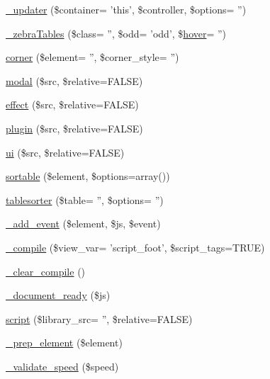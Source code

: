 \begin{DoxyCompactItemize}
\item 
\hyperlink{class_c_i___jquery_a406a331f77c28df7ef87bc4ab0c9340b}{\-\_\-updater} (\$container= 'this', \$controller, \$options= '')
\item 
\hyperlink{class_c_i___jquery_a15c7aa190a2393ebd888da2a6a612f6c}{\-\_\-zebra\-Tables} (\$class= '', \$odd= 'odd', \$\hyperlink{class_c_i___javascript_ab699260782310abba39faf37c2866c48}{hover}= '')
\item 
\hyperlink{class_c_i___jquery_a0194acb433b4ce6b5b0d9d30cccceafb}{corner} (\$element= '', \$corner\-\_\-style= '')
\item 
\hyperlink{class_c_i___jquery_a951696f5f5092fee0d2aba1f8602b419}{modal} (\$src, \$relative=F\-A\-L\-S\-E)
\item 
\hyperlink{class_c_i___jquery_a42898d255de9b25100e042825a1c4633}{effect} (\$src, \$relative=F\-A\-L\-S\-E)
\item 
\hyperlink{class_c_i___jquery_a25a0d7f0c18dac193aa2c67908c85c89}{plugin} (\$src, \$relative=F\-A\-L\-S\-E)
\item 
\hyperlink{class_c_i___jquery_ad2d6d964ed10597e0223f883c553cf0c}{ui} (\$src, \$relative=F\-A\-L\-S\-E)
\item 
\hyperlink{class_c_i___jquery_afb2aa7347e6ff89ab0177478a7f3869d}{sortable} (\$element, \$options=array())
\item 
\hyperlink{class_c_i___jquery_adb63aaf8e4cfc75853599e65ac3574a4}{tablesorter} (\$table= '', \$options= '')
\item 
\hyperlink{class_c_i___jquery_acb1530e106b7717d7c031dcb082a0da8}{\-\_\-add\-\_\-event} (\$element, \$js, \$event)
\item 
\hyperlink{class_c_i___jquery_acff3bdbec9dca4a5ad6d16eed6f15607}{\-\_\-compile} (\$view\-\_\-var= 'script\-\_\-foot', \$script\-\_\-tags=T\-R\-U\-E)
\item 
\hyperlink{class_c_i___jquery_a8508147ee3b37f58e7c58f365c6c1409}{\-\_\-clear\-\_\-compile} ()
\item 
\hyperlink{class_c_i___jquery_a5d111acaf02096fa67c90954167c202f}{\-\_\-document\-\_\-ready} (\$js)
\item 
\hyperlink{class_c_i___jquery_a9ea7c49c96462a9ee8f8242c257937ac}{script} (\$library\-\_\-src= '', \$relative=F\-A\-L\-S\-E)
\item 
\hyperlink{class_c_i___jquery_a6dd4fcc0640975784e69d1ea11eba291}{\-\_\-prep\-\_\-element} (\$element)
\item 
\hyperlink{class_c_i___jquery_aea8d69840297d111305f7b5ff9982573}{\-\_\-validate\-\_\-speed} (\$speed)
\end{DoxyCompactItemize}
